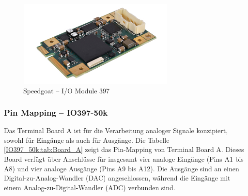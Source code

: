 \pagebreak[1]
\begin{figure}[!ht]
	\begin{center}
		\includegraphics[width=0.7\textwidth]{img/2_steuerung/goat_io397.png}
		\caption{Speedgoat – I/O Module 397 \cite{speedgoat:IO397_50k}}
		\label{IO397_50k:img:Module}
	\end{center}
\end{figure}
\pagebreak[1]

\subsubsection{Pin Mapping – IO397-50k}


Das Terminal Board A ist für die Verarbeitung analoger Signale konzipiert, sowohl für Eingänge als auch für Ausgänge. Die Tabelle \ref{IO397_50k:tab:Board_A} zeigt das Pin-Mapping von Terminal Board A. Dieses Board verfügt über Anschlüsse für insgesamt vier analoge Eingänge (Pins A1 bis A8) und vier analoge Ausgänge (Pins A9 bis A12). Die Ausgänge sind an einen Digital-zu-Analog-Wandler (DAC) angeschlossen, während die Eingänge mit einem Analog-zu-Digital-Wandler (ADC) verbunden sind.

